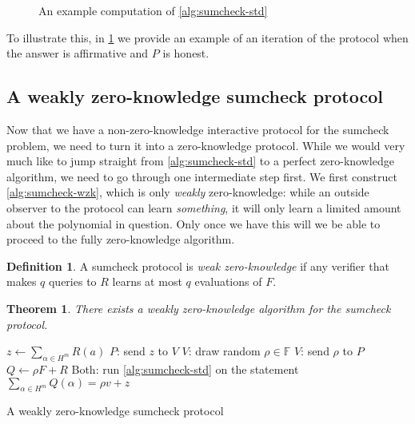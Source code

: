 \documentclass[english,12pt]{reedthesis}
\theoremstyle{plain}
\newtheorem{thm}{Theorem}[section]
\theoremstyle{definition}
\newtheorem{defn}[defn]{Definition}
\theoremstyle{remark}
\begin{document}
\begin{figure}[htbp]
  \caption{An example computation of \cref{alg:sumcheck-std}}\label{fig:sumcheck-ex}
\end{figure}

To illustrate this, in \cref{fig:sumcheck-ex} we provide an example of an
iteration of the protocol when the answer is affirmative and $P$ is honest.

\subsection{A weakly zero-knowledge sumcheck protocol}

Now that we have a non-zero-knowledge interactive protocol for the sumcheck
problem, we need to turn it into a zero-knowledge protocol. While we would very
much like to jump straight from \cref{alg:sumcheck-std} to a perfect
zero-knowledge algorithm, we need to go through one intermediate step first. We
first construct \cref{alg:sumcheck-wzk}, which is only \emph{weakly}
zero-knowledge: while an outside observer to the protocol can learn
\emph{something}, it will only learn a limited amount about the polynomial in
question. Only once we have this will we be able to proceed to the fully
zero-knowledge algorithm.

\begin{defn}\label{def:weak-zk}
  A sumcheck protocol is \emph{weak zero-knowledge} if any verifier that makes
  $q$ queries to $R$ learns at most $q$ evaluations of $F$.
\end{defn}

\begin{thm}
  There exists a weakly zero-knowledge algorithm for the sumcheck protocol.
\end{thm}

\begin{algorithm}[htbp]
  $z \leftarrow \sum_{\alpha \in H^{m}}R(a)$\;
  $P$: send $z$ to $V$\;
  $V$: draw random $\rho \in \mathbb{F}$\;
  $V$: send $\rho$ to $P$\;
  $Q \leftarrow \rho F + R$\;
  Both: run \cref{alg:sumcheck-std} on the statement $\sum_{\alpha \in H^{m}}Q(\alpha) = \rho v + z$\;
  \caption{A weakly zero-knowledge sumcheck protocol~\cite[Construction
    5.4]{BCFGRS17}}\label{alg:sumcheck-wzk}
\end{algorithm}
\end{document}
